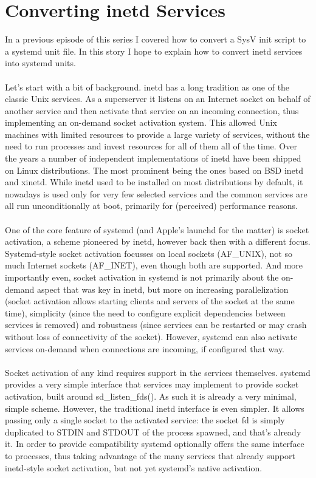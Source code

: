 \documentclass[titlepage]{article}
\begin{document}
\section{Converting inetd Services}
In a previous episode of this series I covered how to convert a SysV init script to a systemd unit file. In this story I hope to explain how to convert inetd services into systemd units.
\\
\\
Let's start with a bit of background. inetd has a long tradition as one of the classic Unix services. As a superserver it listens on an Internet socket on behalf of another service and then activate that service on an incoming connection, thus implementing an on-demand socket activation system. This allowed Unix machines with limited resources to provide a large variety of services, without the need to run processes and invest resources for all of them all of the time. Over the years a number of independent implementations of inetd have been shipped on Linux distributions. The most prominent being the ones based on BSD inetd and xinetd. While inetd used to be installed on most distributions by default, it nowadays is used only for very few selected services and the common services are all run unconditionally at boot, primarily for (perceived) performance reasons.
\\
\\
One of the core feature of systemd (and Apple's launchd for the matter) is socket activation, a scheme pioneered by inetd, however back then with a different focus. Systemd-style socket activation focusses on local sockets (AF\_UNIX), not so much Internet sockets (AF\_INET), even though both are supported. And more importantly even, socket activation in systemd is not primarily about the on-demand aspect that was key in inetd, but more on increasing parallelization (socket activation allows starting clients and servers of the socket at the same time), simplicity (since the need to configure explicit dependencies between services is removed) and robustness (since services can be restarted or may crash without loss of connectivity of the socket). However, systemd can also activate services on-demand when connections are incoming, if configured that way.
\\
\\
Socket activation of any kind requires support in the services themselves. systemd provides a very simple interface that services may implement to provide socket activation, built around sd\_listen\_fds(). As such it is already a very minimal, simple scheme. However, the traditional inetd interface is even simpler. It allows passing only a single socket to the activated service: the socket fd is simply duplicated to STDIN and STDOUT of the process spawned, and that's already it. In order to provide compatibility systemd optionally offers the same interface to processes, thus taking advantage of the many services that already support inetd-style socket activation, but not yet systemd's native activation.
\end{document}
